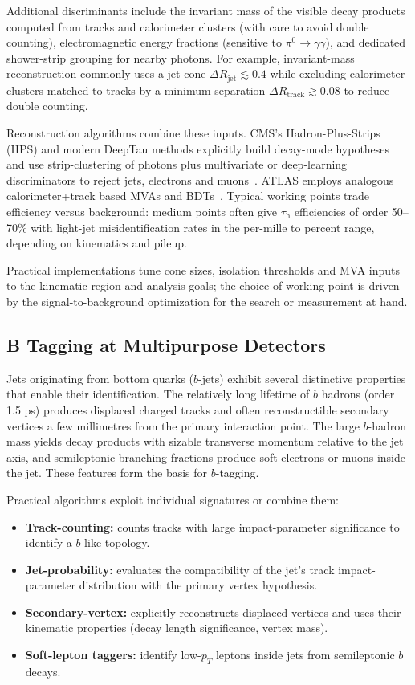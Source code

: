 Additional discriminants include the invariant mass of the visible decay products computed from tracks and calorimeter clusters (with care to avoid double counting), electromagnetic energy fractions (sensitive to $\pi^0\to\gamma\gamma$), and dedicated shower-strip grouping for nearby photons. For example, invariant-mass reconstruction commonly uses a jet cone $\Delta R_{\text{jet}}\lesssim0.4$ while excluding calorimeter clusters matched to tracks by a minimum separation $\Delta R_{\text{track}}\gtrsim0.08$ to reduce double counting.

Reconstruction algorithms combine these inputs. CMS's Hadron-Plus-Strips (HPS) and modern DeepTau methods explicitly build decay-mode hypotheses and use strip-clustering of photons plus multivariate or deep-learning discriminators to reject jets, electrons and muons~\parencite{CMS:2022ydz,CMS_DeepTau}. ATLAS employs analogous calorimeter+track based MVAs and BDTs~\parencite{ATLAS:2022fgo}. Typical working points trade efficiency versus background: medium points often give $\tau_{\mathrm{h}}$ efficiencies of order 50–70\% with light-jet misidentification rates in the per-mille to percent range, depending on kinematics and pileup.

Practical implementations tune cone sizes, isolation thresholds and MVA inputs to the kinematic region and analysis goals; the choice of working point is driven by the signal-to-background optimization for the search or measurement at hand.

\subsection{B Tagging at Multipurpose Detectors}

Jets originating from bottom quarks ($b$-jets) exhibit several distinctive properties that enable their identification. The relatively long lifetime of $b$ hadrons (order 1.5 ps) produces displaced charged tracks and often reconstructible secondary vertices a few millimetres from the primary interaction point. The large $b$-hadron mass yields decay products with sizable transverse momentum relative to the jet axis, and semileptonic branching fractions produce soft electrons or muons inside the jet. These features form the basis for $b$-tagging.

Practical algorithms exploit individual signatures or combine them:
\begin{itemize}
  \item \textbf{Track-counting:} counts tracks with large impact-parameter significance to identify a $b$-like topology.
  \item \textbf{Jet-probability:} evaluates the compatibility of the jet's track impact-parameter distribution with the primary vertex hypothesis.
  \item \textbf{Secondary-vertex:} explicitly reconstructs displaced vertices and uses their kinematic properties (decay length significance, vertex mass).
  \item \textbf{Soft-lepton taggers:} identify low-$p_T$ leptons inside jets from semileptonic $b$ decays.
\end{itemize}

